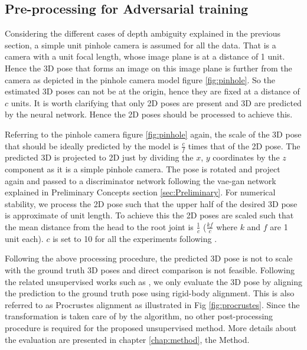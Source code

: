 \subsection{Pre-processing for Adversarial training}
Considering the different cases of depth ambiguity explained in the previous section, a simple unit pinhole camera is assumed for all the data. That is a camera with a unit focal length, whose image plane is at a distance of 1 unit. Hence the 3D pose that forms an image on this image plane is further from the camera as depicted in the pinhole camera model figure \ref{fig:pinhole}. So the estimated 3D poses can not be at the origin, hence they are fixed at a distance of $c$ units. It is worth clarifying that only 2D poses are present and 3D are predicted by the neural network. Hence the 2D poses should be processed to achieve this. 

Referring to the pinhole camera figure \ref{fig:pinhole} again, the scale of the 3D pose that should be ideally predicted by the model is $\frac{c}{f}$ times that of the 2D pose. The predicted 3D is projected to 2D just by dividing the $x$, $y$ coordinates by the $z$ component as it is a simple pinhole camera. The pose is rotated and project again and passed to a discriminator network following the \ac{vae}-\ac{gan} network explained in Preliminary Concepts section \ref{sec:Preliminary}. For numerical stability, we process the 2D pose such that the upper half of the desired 3D pose is approximate of unit length. To achieve this the 2D poses are scaled such that the mean distance from the head to the root joint is $\frac{1}{c}$ ($\frac{k f}{c}$ where $k$ and $f$ are 1 unit each). $c$ is set to 10 for all the experiments following \cite{amazon1}.

Following the above processing procedure, the predicted 3D pose is not to scale with the ground truth 3D poses and direct comparison is not feasible. Following the related unsupervised works such as \cite{amazon1}, we only evaluate the 3D pose by aligning the prediction to the ground truth pose using rigid-body alignment. This is also referred to as Procrustes alignment \cite{Procrustes_wiki} as illustrated in Fig \ref{fig:procrustes}. Since the transformation is taken care of by the algorithm, no other post-processing procedure is required for the proposed unsupervised method. More details about the evaluation are presented in chapter \ref{chap:method}, the Method.



